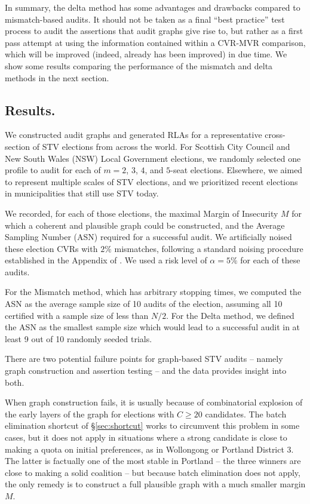 In summary, the delta method has some advantages and drawbacks compared to mismatch-based audits. 
It should not be taken as a final ``best practice'' test process to audit the assertions that audit graphs give rise to, but rather as a first pass attempt at using the information contained within a CVR-MVR comparison, which will be improved (indeed, already has been improved) in due time.
We show some results comparing the performance of the mismatch and delta methods in the next section. %
\subsection{Results.}\label{sec:results}
We constructed audit graphs and generated RLAs for a representative cross-section of STV elections from across the world.
For Scottish City Council and New South Wales (NSW) Local Government elections, we randomly selected one profile to audit for each of $m=2$, $3$, $4$, and $5$-seat elections. 
Elsewhere, we aimed to represent multiple scales of STV elections, and we prioritized recent elections in municipalities that still use STV today.

We recorded, for each of those elections, the maximal Margin of Insecurity $M$ for which a coherent and plausible graph could be constructed, and the Average Sampling Number (ASN) required for a successful audit.
We artificially noised these election CVRs with $2\%$ mismatches, following a standard noising procedure established in the Appendix of \cite{blomRAIRERiskLimitingAudits2019b}. We used a risk level of $\alpha = 5\%$ for each of these audits.

For the Mismatch method, which has arbitrary stopping times, we computed the ASN as the average sample size of 10 audits of the election, assuming all 10 certified with a sample size of less than $N/2$. 
For the Delta method, we defined the ASN as the smallest sample size which would lead to a successful audit in at least 9 out of 10 randomly seeded trials.

There are two potential failure points for graph-based STV audits -- namely graph construction and assertion testing -- and the data provides insight into both.

When graph construction fails, it is usually because of combinatorial explosion of the early layers of the graph for elections with $C\geq 20$ candidates. 
The batch elimination shortcut of \S\ref{sec:shortcut} works to circumvent this problem in some cases, but it does not apply in situations where a strong candidate is close to making a quota on initial preferences, as in Wollongong or Portland District 3.
The latter is factually one of the most stable in Portland -- the three winners are close to making a solid coalition -- but because batch elimination does not apply, the only remedy is to construct a full plausible graph with a much smaller margin $M$.

